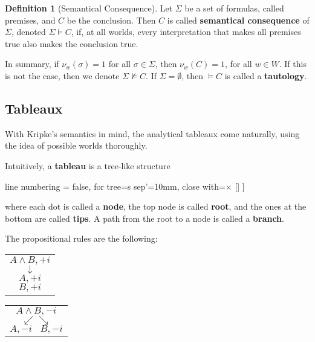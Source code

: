 \documentclass[12pt,a4paper]{article}
\theoremstyle{definition}
\newtheorem{definition}{Definition}[section]
\begin{document}
\begin{definition}[Semantical Consequence]
    Let $\Sigma$ be a set of formulas, called premises, and $C$ be the conclusion. Then $C$ is called \textbf{semantical consequence} of $\Sigma$, denoted $\Sigma \vDash C$, if, at all worlds, every interpretation that makes all premises true also makes the conclusion true.
    
    In summary, if $\nu_{w}(\sigma) = 1$ for all $\sigma \in \Sigma$, then $\nu_{w}(C) = 1$, for all $w \in W$. If this is not the case, then we denote $\Sigma \not\vDash C$. If $\Sigma = \emptyset$, then $\vDash C$ is called a \textbf{tautology}.
\end{definition}


\subsection{Tableaux}
\label{Tableaux}

With Kripke's semantics in mind, the analytical tableaux come naturally, using the idea of possible worlds thoroughly.

Intuitively, a \textbf{tableau} is a tree-like structure

\begin{center}
\begin{tableau}
{
    line numbering = false,
    for tree={s sep'=10mm},
    close with=$\times$ %
}
[\cdot
    [\cdot]
    [\cdot
        [\cdot]
        [\cdot]
    ]
]
\end{tableau}
\end{center}
where each dot is called a \textbf{node}, the top node is called \textbf{root}, and the ones at the bottom are called \textbf{tips}. A path from the root to a node is called a \textbf{branch}.

The propositional rules are the following:

\begin{minipage}{0.4\textwidth}
\begin{tabular}{p{\textwidth}}
\[ A \land B, +i \]
\[ \downarrow \]
\[ A, +i \]
\[ B, +i \]
\end{tabular}
\end{minipage}
\hfill
\begin{minipage}{0.4\textwidth}
\begin{tabular}{p{\textwidth}}
\[ A \land B,-i \]
\[ \swarrow \searrow \]
\[ A, -i \hspace{10pt} B, -i \]
\end{tabular}
\end{minipage}
\end{document}
